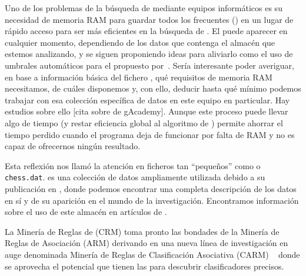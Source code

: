 Uno de los problemas de la búsqueda de \ars mediante equipos informáticos es su necesidad de memoria RAM para guardar todos los \itemsets frecuentes (\aprioriL) en un lugar de rápido acceso para ser más eficientes en la búsqueda de \ars. El \dilemaIR puede aparecer en cualquier momento, dependiendo de los datos que contenga el almacén \D que estemos analizando, y se siguen proponiendo ideas para aliviarlo como el uso de umbrales automáticos para el \soporte propuesto por~\citet{SadhasivamAngamuthu-MiningRareItemsetWithAutomatedSupportThresholds-2011}. Sería interesante poder averiguar, en base a información básica del fichero \D, qué requisitos de memoria RAM necesitamos, de cuáles disponemos y, con ello, deducir hasta qué \soporte mínimo podemos trabajar con esa colección específica de datos en este equipo en particular. Hay estudios sobre ello [cita sobre \mushroom de gAcademy]. Aunque este proceso puede llevar algo de tiempo (y restar eficiencia global al algoritmo de \FIM) permite ahorrar el tiempo perdido cuando el programa deja de funcionar por falta de RAM y no es capaz de ofrecernos ningún resultado.

Esta reflexión nos llamó la atención en ficheros tan "`pequeños"' como \mushroom o \texttt{chess.dat}. \mushroom es una colección de datos ampliamente utilizada debido a su publicación en , donde podemos encontrar una completa descripción de los datos en sí y de su aparición en el mundo de la investigación. Encontramos información sobre el uso de este almacén \D en artículos de \clasificacion.

La Minería de Reglas de \Clasificacion (CRM) toma pronto las bondades de la Minería de Reglas de Asociación (ARM) derivando en una nueva línea de investigación en auge denominada Minería de Reglas de Clasificación Asociativa (CARM) ~\citep{LiuHsuMa-IntegratingClassificationAndARM-1998, Bayardo-EfficientlyMiningLongPatternsFromDB-1998, WangXinCoenen-MiningEfficientlySignificantCAR-2008} donde se aprovecha el potencial que tienen las \ars para descubrir clasificadores precisos.

